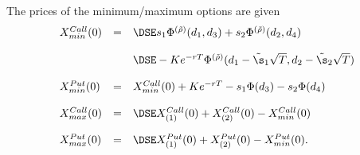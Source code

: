 	The prices of the minimum/maximum options are given
		$$
		\begin{array}{lll}
		X_{min}^{Call}(0) &=& \DSE s_1 \Phi^{(\tilde{\rho})}(d_1,d_3)+ s_2 \Phi^{(\tilde{\rho})}(d_2,d_4)\\*[12pt]
		&&\DSE - K e^{-rT} \Phi^{(\tilde{\rho})}(d_1-\tilde{\s}_1\sqrt{T},d_2-\tilde{\s}_2\sqrt{T})\\*[12pt]
		X_{min}^{Put}(0) &=& X_{min}^{Call}(0)+Ke^{-rT}-s_1\Phi(d_3)-s_2\Phi(d_4)\\*[12pt]
		X_{max}^{Call}(0) &=& \DSE X_{(1)}^{Call}(0)+X_{(2)}^{Call}(0)- X_{min}^{Call}(0)\\*[12pt]
		X_{max}^{Put}(0) &=& \DSE X_{(1)}^{Put}(0)+X_{(2)}^{Put}(0)- X_{min}^{Put}(0).
		\end{array}
		$$
